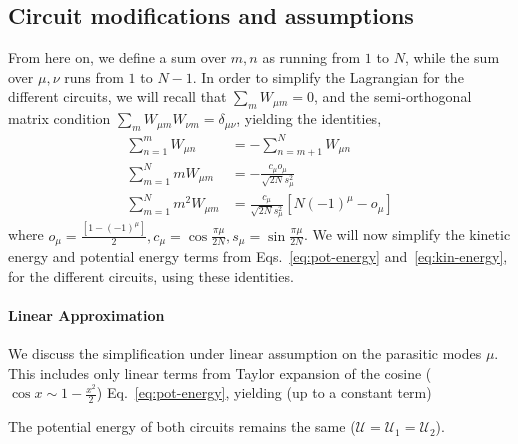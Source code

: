 \documentclass[%
reprint,
superscriptaddress,
 amsmath,amssymb,
 aps,
 prx,
longbibliography,
floatfix,
]{revtex4-2}
\begin{document}
\subsection{Circuit modifications and assumptions}
From here on, we define a sum over $m,n$ as running from $1$ to $N$, while the sum over $\mu,\nu$ runs from $1$ to $N-1$. In order to simplify the Lagrangian for the different circuits, we will recall that $\sum_m W_{\mu m}=0$, and the semi-orthogonal matrix condition $\sum_m W_{\mu m}W_{\nu m}=\delta_{\mu\nu}$, yielding the identities,
\begin{align}
 \sum_{n=1}^m W_{\mu n}&=-\sum_{n=m+1}^N W_{\mu n}\\
 \sum_{m=1}^N mW_{\mu m}&=-\frac{c_\mu o_{\mu}}{\sqrt{2N}s_\mu^2}\\
 \sum_{m=1}^N m^2W_{\mu m}&=\frac{c_\mu}{\sqrt{2N}s_\mu^2}[N(-1)^\mu-o_\mu]
\end{align}
where $o_\mu=\frac{[1-(-1)^\mu]}{2},c_\mu=\cos{\frac{\pi\mu}{2N}}, s_\mu=\sin{\frac{\pi\mu}{2N}}$. We will now simplify the kinetic energy and potential energy terms from Eqs.~\ref{eq:pot-energy} and~\ref{eq:kin-energy}, for the different circuits, using these identities.
\paragraph{Linear Approximation}
We discuss the simplification under linear assumption on the parasitic modes $\mu$. This includes only linear terms from Taylor expansion of the cosine ($\cos{x}\sim 1-\frac{x^2}{2}$) Eq.~\ref{eq:pot-energy}, yielding (up to a constant term)

 The potential energy of both circuits remains the same ($\mathcal{U}=\mathcal{U}_1=\mathcal{U}_2$). 
\end{document}
